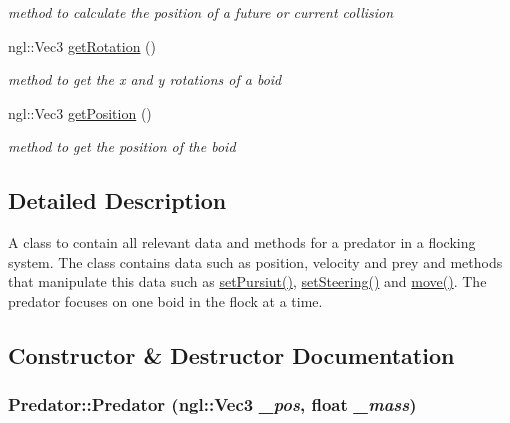 \begin{DoxyCompactItemize}
\begin{DoxyCompactList}\small\item\em method to calculate the position of a future or current collision \item\end{DoxyCompactList}\item 
ngl::Vec3 \hyperlink{classPredator_ac121a9634fefa30e33b13468bbbd61c2}{getRotation} ()
\begin{DoxyCompactList}\small\item\em method to get the x and y rotations of a boid \item\end{DoxyCompactList}\item 
ngl::Vec3 \hyperlink{classPredator_a55f8b25f098668a89fb65aab55e48313}{getPosition} ()
\begin{DoxyCompactList}\small\item\em method to get the position of the boid \item\end{DoxyCompactList}\end{DoxyCompactItemize}


\subsection{Detailed Description}
A class to contain all relevant data and methods for a predator in a flocking system. The class contains data such as position, velocity and prey and methods that manipulate this data such as \hyperlink{classPredator_a2e5d5f04490a8c579c1fc7e4b9886828}{setPursiut()}, \hyperlink{classPredator_a8f2a2bec2b92689dbd78a6081269e7cb}{setSteering()} and \hyperlink{classPredator_ac387f969b16cf3651b097f4470368683}{move()}. The predator focuses on one boid in the flock at a time. 

\subsection{Constructor \& Destructor Documentation}
\hypertarget{classPredator_ae3a98f1fcce9212de86d15883c501505}{
\subsubsection[{Predator}]{\setlength{\rightskip}{0pt plus 5cm}Predator::Predator (ngl::Vec3 {\em \_\-pos}, \/  float {\em \_\-mass})}}
\label{classPredator_ae3a98f1fcce9212de86d15883c501505}


